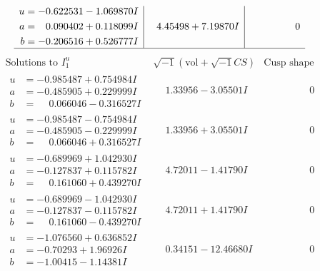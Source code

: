 \documentclass[1p]{elsarticle_modified}
\theoremstyle{definition}
\newcommand{\I}{\sqrt{-1}}
\begin{document}
$$\begin{array}{c|c|c}
\begin{aligned}
u &= -0.622531 - 1.069870 I \\
a &= \phantom{-}0.090402 + 0.118099 I \\
b &= -0.206516 + 0.526777 I\end{aligned}
 & \phantom{-}4.45498 + 7.19870 I & \phantom{-0.000000 } 0\\
 \hline 
 \end{array}$$\newpage$$\begin{array}{c|c|c}  
\text{Solutions to }I^u_{1}& \I (\text{vol} + \sqrt{-1}CS) & \text{Cusp shape}\\
 \hline 
\begin{aligned}
u &= -0.985487 + 0.754984 I \\
a &= -0.485905 + 0.229999 I \\
b &= \phantom{-}0.066046 - 0.316527 I\end{aligned}
 & \phantom{-}1.33956 - 3.05501 I & \phantom{-0.000000 } 0 \\ \hline\begin{aligned}
u &= -0.985487 - 0.754984 I \\
a &= -0.485905 - 0.229999 I \\
b &= \phantom{-}0.066046 + 0.316527 I\end{aligned}
 & \phantom{-}1.33956 + 3.05501 I & \phantom{-0.000000 } 0 \\ \hline\begin{aligned}
u &= -0.689969 + 1.042930 I \\
a &= -0.127837 + 0.115782 I \\
b &= \phantom{-}0.161060 + 0.439270 I\end{aligned}
 & \phantom{-}4.72011 - 1.41790 I & \phantom{-0.000000 } 0 \\ \hline\begin{aligned}
u &= -0.689969 - 1.042930 I \\
a &= -0.127837 - 0.115782 I \\
b &= \phantom{-}0.161060 - 0.439270 I\end{aligned}
 & \phantom{-}4.72011 + 1.41790 I & \phantom{-0.000000 } 0 \\ \hline\begin{aligned}
u &= -1.076560 + 0.636852 I \\
a &= -0.70293 + 1.96926 I \\
b &= -1.00415 - 1.14381 I\end{aligned}
 & \phantom{-}0.34151 - 12.46680 I & \phantom{-0.000000 } 0 \\ \hline\begin{aligned}

\end{aligned}
\end{array}$$
\end{document}
